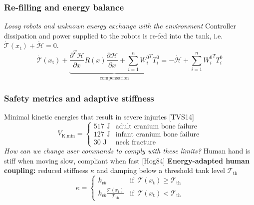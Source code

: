 \documentclass[student]{ITRslides}
\newcommand{\g}[1]{\text{#1}}
\begin{document}
\begin{frame}
	\frametitle{Re-filling and energy balance}
	\begin{figure}[b!]
		\centering
		\footnotesize
		\def\svgwidth{0.95\columnwidth}
						
	\end{figure}
	\textit{Lossy robots and unknown energy exchange with the environment}
	Controller dissipation and power supplied to the robots is re-fed into the tank, i.e. $\dot{\mathcal{T}}(x_\g{t})+\dot{\mathcal{H}}=0$.
	\[
	\dot{\mathcal{T}}(x_\g{t}) + \underbrace{\frac{\partial^T \mathcal{H}}{\partial x}R(x)\frac{\partial \mathcal{H}}{\partial x} + \sum_{i=1}^n {W_i^{0}}^T T_i^0}_{\text{compensation}} = - \dot{{\mathcal{H}}} + \sum_{i=1}^n {W_i^{0}}^T T_i^0
	\] 
\end{frame}

\begin{frame}
	\frametitle{Safety metrics and adaptive stiffness}
	Minimal kinetic energies that result in severe injuries \nocite{Tadele_14}{\tiny [TVS14]}
	\[
	V_{\g{K,min}} = 
	\begin{cases}
	517 \text{ J} & \text{adult cranium bone failure} \\
	127 \text{ J} & \text{infant cranium bone failure} \\
	30 \text{ J} & \text{neck fracture}
	\end{cases}
	\]
	\textit{How can we change user commands to comply with these limits?}
	Human hand is stiff when moving slow, compliant when fast \nocite{Hogan_84b}{\tiny [Hog84]}
	\textbf{Energy-adapted human coupling:} reduced stiffness $\kappa$ and damping below a threshold tank level $\mathcal{T}_{\g{th}}$
	\[
	\kappa = \begin{cases}
	k_{vb} & \text{if } \, \mathcal{T}(x_\g{t})\geq \mathcal{T}_{\g{th}} \\
	k_{vb} \frac{\mathcal{T}(x_\g{t})}{\mathcal{T}_{\g{th}}} & \text{if } \, \mathcal{T}(x_\g{t}) < \mathcal{T}_{\g{th}}
	\end{cases} \]
	\end{frame}
\end{document}
